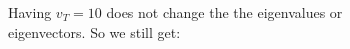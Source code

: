 \documentclass[preview]{standalone}
\begin{document}
\begin{center}
\raggedright
                Having $v_T = 10$ does not change the the eigenvalues or \\ 
                  eigenvectors. So we still get:
\end{center}
\end{document}
